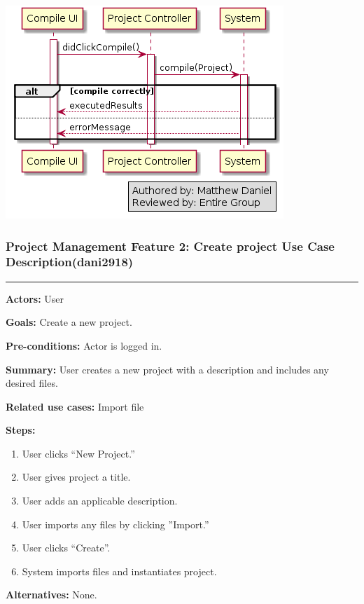 \documentclass[twoside,letterpaper]{article}
\begin{document}
\includegraphics[width=\textwidth]{images/SequenceDiagrams/PMCompile}

\newpage


\newpage

\subsubsection[Project Management Feature 2: Create project Use Case Description (dani2918)]{\rmfamily\bfseries\color{black}
	Project Management Feature 2: Create project Use Case Description(dani2918)}
\hypertarget{RefHeading22059017292}{}
\bigskip

\vspace{2pt}
\hrule
\vspace{8pt}
 \noindent \textbf{Actors:} User \newline
 
 \noindent \textbf{Goals:} Create a new project. \newline
 
 \noindent  \textbf{Pre-conditions:} Actor is logged in.  \newline
 
 \noindent \textbf{Summary:} User creates a new project with a description and includes any desired files. \newline
 
 \noindent \textbf{Related use cases:} Import file \newline
 
 \noindent \textbf{Steps:} \begin{enumerate}
  \item User clicks ``New Project.''
  \item User gives project a title.
  \item User adds an applicable description.
  \item User imports any files by clicking ''Import.''
  \item User clicks ``Create''.
  \item System imports files and instantiates project.
 \end{enumerate}
 \textbf{Alternatives:} None. \newline
 
\end{document}

